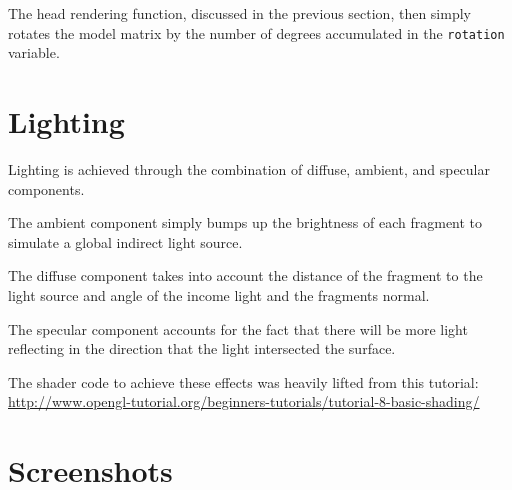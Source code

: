 \documentclass{article}
\newcommand{\mylisting}[3]{
    
}
\begin{document}
\mylisting{../code/main.cpp}{113-114}{Rotation}

The head rendering function, discussed in the previous section, then simply
rotates the model matrix by the number of degrees accumulated in the
\texttt{rotation} variable.

\mylisting{../code/head.cpp}{84-85}{Model Matrix Rotation}

\section*{Lighting}

Lighting is achieved through the combination of diffuse, ambient, and specular components.

The ambient component simply bumps up the brightness of each fragment to
simulate a global indirect light source.

The diffuse component takes into account the distance of the fragment to the
light source and angle of the income light and the fragments normal.

The specular component accounts for the fact that there will be more light
reflecting in the direction that the light intersected the surface.

\mylisting{../code/head_frag.glsl}{18-44}{Head Fragment Shader}

The shader code to achieve these effects was heavily lifted from this tutorial:\\
\url{http://www.opengl-tutorial.org/beginners-tutorials/tutorial-8-basic-shading/}

\section*{Screenshots}
\end{document}
